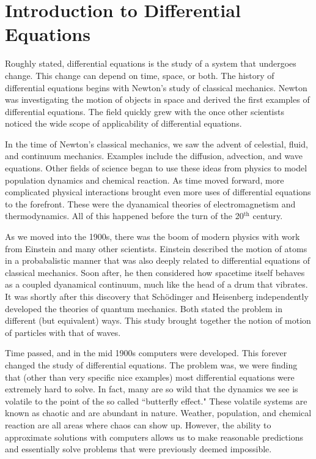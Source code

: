     \chapter{Introduction to Differential Equations}
    
        Roughly stated, differential equations is the study of a system that undergoes change.  This change can depend on time, space, or both.  The history of differential equations begins with Newton's study of classical mechanics.  Newton was investigating the motion of objects in space and derived the first examples of differential equations.  The field quickly grew with the once other scientists noticed the wide scope of applicability of differential equations.  
        
        In the time of Newton's classical mechanics, we saw the advent of celestial, fluid, and continuum mechanics. Examples include the diffusion, advection, and wave equations.  Other fields of science began to use these ideas from physics to model population dynamics and chemical reaction.  As time moved forward, more complicated physical interactions brought even more uses of differential equations to the forefront.  These were the dyanamical theories of electromagnetism and thermodynamics.  All of this happened before the turn of the 20$^\textrm{th}$ century.
        
        As we moved into the 1900s, there was the boom of modern physics with work from Einstein and many other scientists.  Einstein described the motion of atoms in a probabalistic manner that was also deeply related to differential equations of classical mechanics.  Soon after, he then  considered how spacetime itself behaves as a coupled dyanamical continuum, much like the head of a drum that vibrates.  It was shortly after this discovery that Sch\"odinger and Heisenberg independently developed the theories of quantum mechanics.  Both stated the problem in different (but equivalent) ways.  This study brought together the notion of motion of particles with that of waves.
        
        Time passed, and in the mid 1900s computers were developed.  This forever changed the study of differential equations.  The problem was, we were finding that (other than very specific nice examples) most differential equations were extremely hard to solve.  In fact, many are so wild that the dynamics we see is volatile to the point of the so called ``butterfly effect."  These volatile systems are known as chaotic and are abundant in nature.  Weather, population, and chemical reaction are all areas where chaos can show up.  However, the ability to approximate solutions with computers allows us to make reasonable predictions and essentially solve problems that were previously deemed impossible.
        
